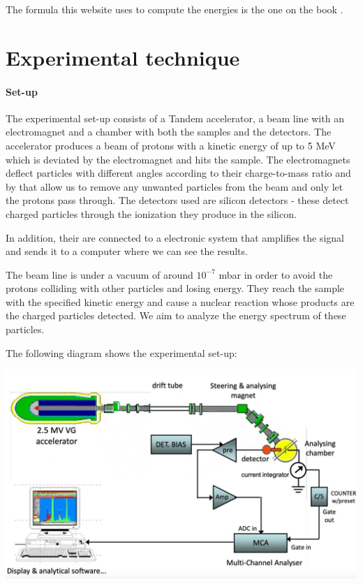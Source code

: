 \documentclass{article}
\begin{document}
\begin{multicols}{2}
The formula this website uses to compute the energies is the one on the book \cite{krane1988}.

\section{Experimental technique}

\paragraph{Set-up}

The experimental set-up consists of a Tandem accelerator, a beam line with an electromagnet and a chamber with both the samples and the detectors.
The accelerator produces a beam of protons with a kinetic energy of up to 5 MeV which is deviated by the electromagnet and hits the sample. 
The electromagnets deflect particles with different angles according to their charge-to-mass ratio and by that allow us to remove any unwanted particles from the beam and only let the protons pass through.
The detectors used are silicon detectors - these detect charged particles through the ionization they produce in the silicon.

In addition, their are connected to a electronic system that amplifies the signal and sends it to a computer where we
can see the results.

The beam line is under a vacuum of around $10^{-7}$ mbar in order to avoid the protons colliding with other particles and losing energy. 
They reach the sample with the specified kinetic energy and cause a nuclear reaction whose products are the charged particles detected.
We aim to analyze the energy spectrum of these particles.

The following diagram shows the experimental set-up:

\begin{center}
  \includegraphics[width=0.95\linewidth]{../images/scheme.jpeg}
  \label{fig:setup}
\end{center}


\end{multicols}
\end{document}
